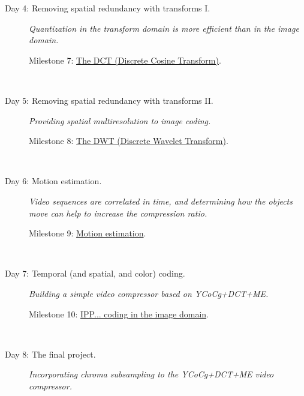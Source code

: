 \begin{description}
\item [Day 4: {\normalfont Removing spatial redundancy with transforms I.}]
  \emph{Quantization in the transform domain is more efficient than in the image domain.}
  \begin{description}
  \item [Milestone 7: {\normalfont \href{https://sistemas-multimedia.github.io/milestones/07-DWT/}{The DCT (Discrete Cosine Transform)}.}]
  \end{description}
  ~\newline

\item [Day 5: {\normalfont Removing spatial redundancy with transforms II.}]
  \emph{Providing spatial multiresolution to image coding.}
  \begin{description}
  \item [Milestone 8: {\normalfont \href{https://sistemas-multimedia.github.io/milestones/08-DWT/}{The DWT (Discrete Wavelet Transform)}.}]
  \end{description}
  ~\newline

\item [Day 6: {\normalfont Motion estimation.}]
  \emph{Video sequences are correlated in time, and determining how the objects move can help to increase the compression ratio.}
  \begin{description}
  \item [Milestone 9: {\normalfont \href{https://sistemas-multimedia.github.io/milestones/10-ME/}{Motion estimation}.}]
  \end{description}
  ~\newline

\item [Day 7: {\normalfont Temporal (and spatial, and color) coding.}]
  \emph{Building a simple video compressor based on YCoCg+DCT+ME.}
  \begin{description}
  \item [Milestone 10: {\normalfont \href{https://sistemas-multimedia.github.io/milestones/11-image_domain_IPP/}{IPP... coding in the image domain}.}]
  \end{description}
  ~\newline

\item [Day 8: {\normalfont The final project.}]
  \emph{Incorporating chroma subsampling to the YCoCg+DCT+ME video compressor.}


\end{description}
